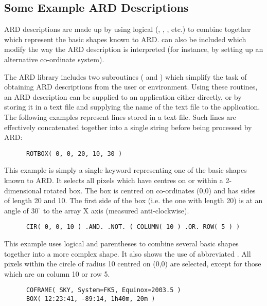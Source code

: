 \subsection{Some Example ARD Descriptions}
ARD descriptions are made up by using logical  
(, , ,
etc.) to combine together  which represent the basic shapes known to ARD.
 can also be included which modify the way the ARD description is
interpreted (for instance, by setting up an alternative co-ordinate system). 

The ARD library includes two subroutines ( and ) which
simplify the task of obtaining ARD descriptions from the user or environment.
Using these routines, an ARD description can be supplied to an application
either directly, or by storing it in a text file and supplying the name of the
text file to the application. The following examples represent lines stored in a
text file. Such lines are effectively concatenated together into a single string
before being processed by ARD: 

\small
\begin{verbatim}
      ROTBOX( 0, 0, 20, 10, 30 )
\end{verbatim}
\normalsize

This example is simply a single keyword representing one of the basic shapes
known to ARD. It selects all pixels which have centres on or within a
2-dimensional rotated box. The box is centred on co-ordinates (0,0) and has
sides of length 20 and 10. The first side of the box (i.e. the one with length 
20) is at an angle of $30^{\circ}$ \hspace{1mm} to the array X axis (measured 
anti-clockwise). 

\small
\begin{verbatim}
      CIR( 0, 0, 10 ) .AND. .NOT. ( COLUMN( 10 ) .OR. ROW( 5 ) )
\end{verbatim}
\normalsize

This example uses logical  and parentheses to combine several basic
shapes together into a more complex shape. It also shows the use of abbreviated
. All pixels within the circle of radius 10 centred on (0,0) are
selected, except for those which are on column 10 or row 5. 

\small
\begin{verbatim}
      COFRAME( SKY, System=FK5, Equinox=2003.5 )
      BOX( 12:23:41, -89:14, 1h40m, 20m ) 
\end{verbatim}
\normalsize

